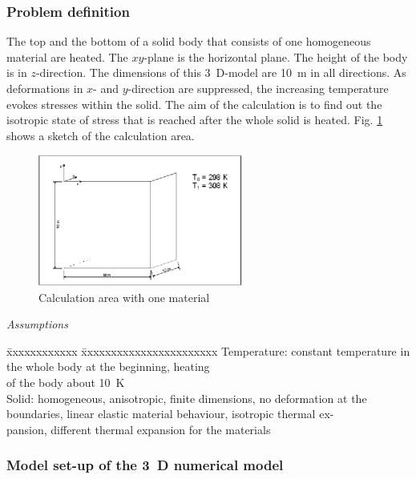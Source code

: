 
\subsubsection{Problem definition}

The top and the bottom of a solid body that consists of one homogeneous material are heated. The $xy$-plane is the horizontal plane. The height of the body is in $z$-direction. The dimensions of this 3~D-model are 10~m in all directions. As deformations in $x$- and $y$-direction are suppressed, the increasing temperature evokes stresses within the solid. The aim of the calculation is to find out the isotropic state of stress that is reached after the whole solid is heated. Fig. \ref{fig61} shows a sketch of the calculation area.

\begin{figure}[htbp]
\centering
\includegraphics[width=0.6\textwidth]{TM/figures/fig61.eps}
\caption{Calculation area with one material}
\label{fig61}
\end{figure}


\textsl{Assumptions}

\begin{tabbing}
\=xxxxxxxxxxxx  \=xxxxxxxxxxxxxxxxxxxxxxx \kill
\> Temperature: \> constant temperature in the whole body at the beginning, heating \\
\> \> of the body about 10~K \\[1.0ex]
\> Solid: \> homogeneous, anisotropic, finite dimensions, no deformation at the \\
\> \> boundaries, linear elastic material behaviour, isotropic thermal ex- \\
\> \> pansion, different thermal expansion for the materials
\end{tabbing}

\subsubsection{Model set-up of the 3~D numerical model}

